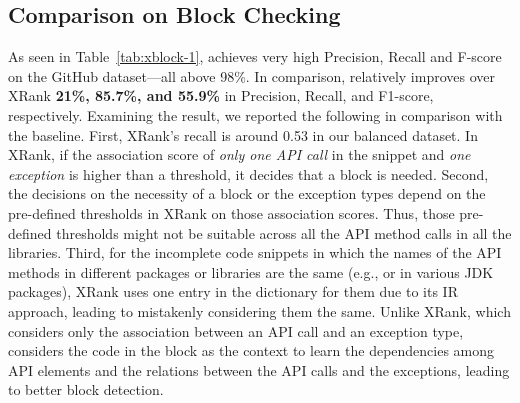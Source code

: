 \subsection{Comparison on  Block Checking}






As seen in Table~\ref{tab:xblock-1}, {\tool} achieves very high
Precision, Recall and F-score on the GitHub dataset---all above
98\%.
In comparison, {\tool} relatively improves over XRank {\bf 21\%, 85.7\%,
and 55.9\%} in Precision, Recall, and F1-score, respectively.
%
Examining the result, we reported the following in comparison with the
baseline.
%
First, XRank's recall is around 0.53 in our balanced dataset. In
XRank, if the association score of {\em only one API call} in the
snippet and {\em one exception} is higher than a threshold, it decides
that a  block is needed.
%
Second, the decisions on the necessity of a  block or
the exception types depend on the pre-defined thresholds in XRank on
those association scores. Thus, those pre-defined thresholds might not
be suitable across all the API method calls in all the
libraries. Third, for the incomplete code snippets in which the names
of the API methods in different packages or libraries are the same
(e.g.,  or  in various JDK packages),
XRank
uses one entry in the dictionary for them due to its IR approach,
leading to mistakenly considering them the same.
%
Unlike XRank, which considers only the association
between an API call and an exception type,
{\tool} considers the code in the block as the context to learn the
dependencies among API elements and the relations between the API
calls and the exceptions, leading to better block detection.


